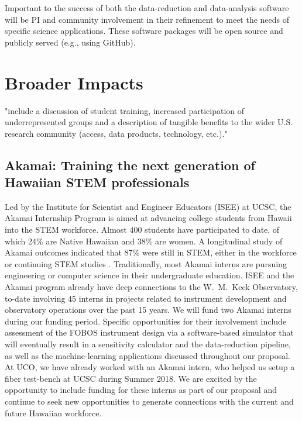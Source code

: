 \documentclass[oneside,11pt]{amsart}
\begin{document}
Important to the success of both the data-reduction and data-analysis
software will be PI and community involvement in their refinement to
meet the needs of specific science applications.  These software
packages will be open source and publicly served (e.g., using GitHub).


\section{Broader Impacts}
\label{sec:bi}

"include a discussion of student training, increased participation of
underrepresented groups and a description of tangible benefits to the
wider U.S. research community (access, data products, technology,
etc.)."

\subsection{Akamai: Training the next generation of Hawaiian STEM
professionals} Led by the Institute for Scientist and Engineer Educators
(ISEE) at UCSC, the Akamai Internship Program is aimed at advancing
college students from Hawaii into the STEM workforce.  Almost 400
students have participated to date, of which 24\% are Native Hawaiian
and 38\% are women. A longitudinal study of Akamai outcomes indicated
that 87\% were still in STEM, either in the workforce or continuing STEM
studies \citep{asee_peer_31030}.  Traditionally, most Akamai interns are
pursuing engineering or computer science in their undergraduate
education.  ISEE and the Akamai program already have deep connections to
the W.~M.~Keck Observatory, to-date involving 45 interns in projects
related to instrument development and observatory operations over the
past 15 years.  We will fund two Akamai interns during our funding
period.  Specific opportunities for their involvement include assessment
of the FOBOS instrument design via a software-based simulator that will
eventually result in a sensitivity calculator and the data-reduction
pipeline, as well as the machine-learning applications discussed
throughout our proposal.  At UCO, we have already worked with an Akamai
intern, who helped us setup a fiber test-bench at UCSC during Summer
2018. We are excited by the opportunity to include funding for these
interns as part of our proposal and continue to seek new opportunities
to generate connections with the current and future Hawaiian workforce.
\end{document}
